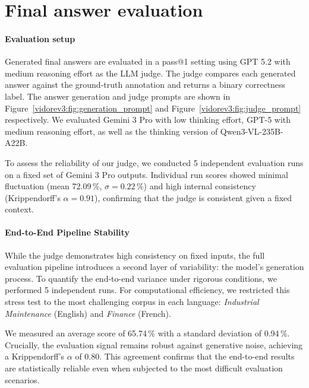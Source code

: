 \section{Final answer evaluation} \label{vidorev3:appendix:final answer eval}

\paragraph{Evaluation setup} Generated final answers are evaluated in a pass@1 setting using GPT 5.2 with medium reasoning effort as the LLM judge. The judge compares each generated answer against the ground-truth annotation and returns a binary correctness label. The answer generation and judge prompts are shown in Figure~\ref{vidorev3:fig:generation_prompt} and Figure~\ref{vidorev3:fig:judge_prompt} respectively. We evaluated Gemini 3 Pro with low thinking effort, GPT-5 with medium reasoning effort, as well as the thinking version of Qwen3-VL-235B-A22B.


To assess the reliability of our judge, we conducted 5 independent evaluation runs on a fixed set of Gemini 3 Pro outputs. Individual run scores showed minimal fluctuation (mean 72.09\,\%, $\sigma=0.22$\,\%) and high internal consistency (Krippendorff's $\alpha = 0.91$), confirming that the judge is consistent given a fixed context.

\paragraph{End-to-End Pipeline Stability} While the judge demonstrates high consistency on fixed inputs, the full evaluation pipeline introduces a second layer of variability: the model's generation process. To quantify the end-to-end variance under rigorous conditions, we performed 5 independent runs. For computational efficiency, we restricted this stress test to the most challenging corpus in each language: \textit{Industrial Maintenance} (English) and \textit{Finance} (French).

We measured an average score of 65.74\,\% with a standard deviation of 0.94\,\%. Crucially, the evaluation signal remains robust against generative noise, achieving a Krippendorff's $\alpha$ of 0.80. This agreement confirms that the end-to-end results are statistically reliable even when subjected to the most difficult evaluation scenarios.

